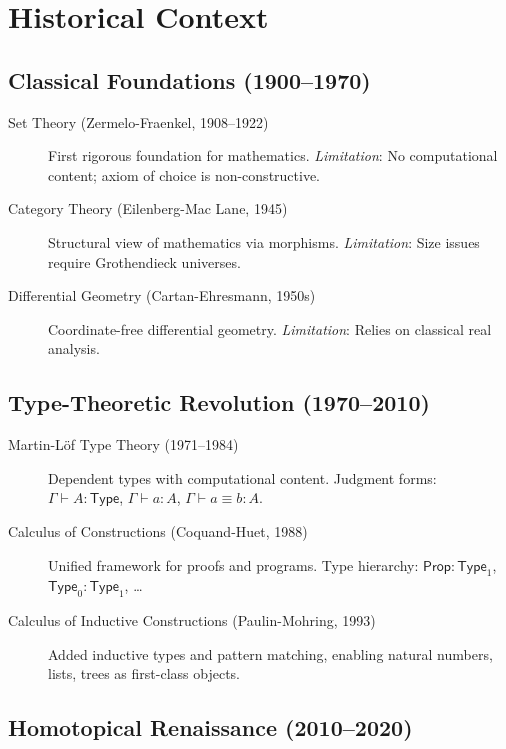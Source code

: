\documentclass[12pt,openright,twoside]{book}
\theoremstyle{plain}
\theoremstyle{definition}
\theoremstyle{remark}
\newcommand{\Type}{\mathsf{Type}}
\newcommand{\Prop}{\mathsf{Prop}}
\newcommand{\proves}{\vdash}
\newcommand{\defeq}{\equiv}
\begin{document}
\section{Historical Context}
\label{sec:history}

\subsection{Classical Foundations (1900–1970)}

\begin{description}
\item[Set Theory (Zermelo-Fraenkel, 1908–1922)] 
First rigorous foundation for mathematics. \emph{Limitation}: No computational content; axiom of choice is non-constructive.

\item[Category Theory (Eilenberg-Mac Lane, 1945)]
Structural view of mathematics via morphisms. \emph{Limitation}: Size issues require Grothendieck universes.

\item[Differential Geometry (Cartan-Ehresmann, 1950s)]
Coordinate-free differential geometry. \emph{Limitation}: Relies on classical real analysis.
\end{description}

\subsection{Type-Theoretic Revolution (1970–2010)}

\begin{description}
\item[Martin-Löf Type Theory (1971–1984)]
Dependent types with computational content. Judgment forms: $\Gamma \proves A : \Type$, $\Gamma \proves a : A$, $\Gamma \proves a \defeq b : A$.

\item[Calculus of Constructions (Coquand-Huet, 1988)]
Unified framework for proofs and programs. Type hierarchy: $\Prop : \Type_1$, $\Type_0 : \Type_1$, \ldots

\item[Calculus of Inductive Constructions (Paulin-Mohring, 1993)]
Added inductive types and pattern matching, enabling natural numbers, lists, trees as first-class objects.
\end{description}

\subsection{Homotopical Renaissance (2010–2020)}
\end{document}
